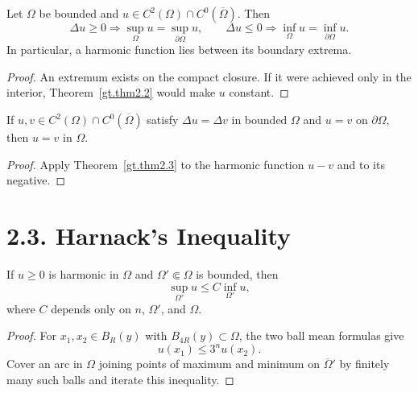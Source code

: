 \begin{theorem}\label{gt.thm2.3}
Let $\Omega$ be bounded and
$u\in C^2(\Omega)\cap C^0(\overline\Omega)$. Then
\begin{equation}
\tag{2.7}
\Delta u\geq0\Longrightarrow
\sup_\Omega u=\sup_{\partial\Omega}u,
\qquad
\Delta u\leq0\Longrightarrow
\inf_\Omega u=\inf_{\partial\Omega}u.
\end{equation}
In particular, a harmonic function lies between its boundary extrema.
\end{theorem}
\begin{proof}
\sketch An extremum exists on the compact closure. If it were achieved only
in the interior, Theorem~\ref{gt.thm2.2} would make $u$ constant.
\end{proof}

\begin{theorem}\label{gt.thm2.4}
If $u,v\in C^2(\Omega)\cap C^0(\overline\Omega)$ satisfy
$\Delta u=\Delta v$ in bounded $\Omega$ and $u=v$ on $\partial\Omega$, then
$u=v$ in $\Omega$.
\end{theorem}
\begin{proof}
\sketch Apply Theorem~\ref{gt.thm2.3} to the harmonic function $u-v$ and
to its negative.
\end{proof}

\section*{2.3. Harnack's Inequality}

\begin{theorem}\label{gt.thm2.5}
If $u\geq0$ is harmonic in $\Omega$ and
$\Omega'\Subset\Omega$ is bounded, then
\begin{equation}
\tag{2.8}
\sup_{\Omega'}u\leq C\inf_{\Omega'}u,
\end{equation}
where $C$ depends only on $n$, $\Omega'$, and $\Omega$.
\end{theorem}
\begin{proof}
\sketch For $x_1,x_2\in B_R(y)$ with $B_{4R}(y)\subset\Omega$, the two ball
mean formulas give
\begin{equation}
\tag{2.9}
u(x_1)\leq3^nu(x_2).
\end{equation}
Cover an arc in $\Omega$ joining
points of maximum and minimum on $\overline\Omega'$ by finitely many such
balls and iterate this inequality.
\end{proof}


